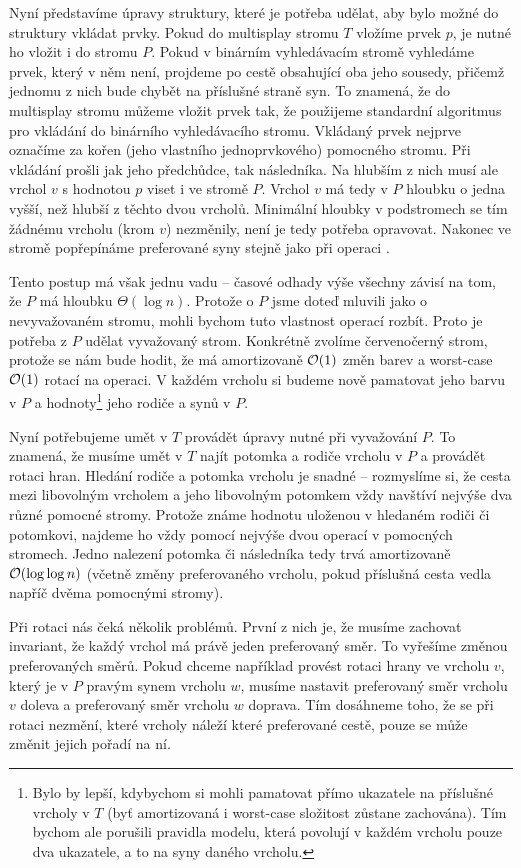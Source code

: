 Nyní představíme úpravy struktury, které je potřeba udělat, aby bylo možné do
struktury vkládat prvky.  Pokud do multisplay stromu $T$ vložíme prvek $p$, je
nutné ho vložit i do stromu $P$. Pokud v binárním vyhledávacím stromě vyhledáme
prvek, který v něm není, projdeme po cestě obsahující oba jeho sousedy, přičemž
jednomu z nich bude chybět na příslušné straně syn. To znamená, že do
multisplay stromu můžeme vložit prvek tak, že použijeme standardní algoritmus
pro vkládání do binárního vyhledávacího stromu. Vkládaný prvek nejprve označíme
za kořen (jeho vlastního jednoprvkového) pomocného stromu. Při vkládání prošli
jak jeho předchůdce, tak následníka. Na hlubším z nich musí ale vrchol $v$ s
hodnotou $p$ viset i ve stromě $P$. Vrchol $v$ má tedy v $P$ hloubku o jedna vyšší,
než hlubší z těchto dvou vrcholů. Minimální hloubky v podstromech se tím
žádnému vrcholu (krom $v$) nezměnily, není je tedy potřeba opravovat. Nakonec
ve stromě popřepínáme preferované syny stejně jako při operaci .

Tento postup má však jednu vadu -- časové odhady výše všechny závisí na tom, že
$P$ má hloubku $\Theta(\log n)$. Protože o $P$ jsme doteď mluvili jako o
nevyvažovaném stromu, mohli bychom tuto vlastnost operací  rozbít.
Proto je potřeba z $P$ udělat vyvažovaný strom. Konkrétně zvolíme červenočerný
strom, protože se nám bude hodit, že má amortizovaně $\mathcal O(1)$ změn barev a
worst-case $\mathcal O(1)$ rotací na operaci. V každém vrcholu si budeme nově pamatovat
jeho barvu v $P$ a hodnoty\footnote{Bylo by lepší, kdybychom si mohli pamatovat
přímo ukazatele na příslušné vrcholy v $T$ (byť amortizovaná i worst-case složitost zůstane zachována). Tím bychom ale
porušili pravidla modelu, která povolují v každém vrcholu pouze dva ukazatele,
a to na syny daného vrcholu.} jeho rodiče a synů v $P$. 

Nyní potřebujeme umět v $T$ provádět úpravy nutné při vyvažování $P$. To
znamená, že musíme umět v $T$ najít potomka a rodiče vrcholu v $P$ a provádět
rotaci hran. Hledání rodiče a potomka vrcholu je snadné -- rozmyslíme si, že
cesta mezi libovolným vrcholem a jeho libovolným potomkem vždy navštíví nejvýše
dva různé pomocné stromy. Protože známe hodnotu uloženou v hledaném rodiči či
potomkovi, najdeme ho vždy pomocí nejvýše dvou operací  v pomocných
stromech. Jedno nalezení potomka či následníka tedy trvá amortizovaně
$\mathcal O(\log\log n)$ (včetně změny preferovaného vrcholu, pokud příslušná cesta
vedla napříč dvěma pomocnými stromy).

Při rotaci nás čeká několik problémů. První z nich je, že musíme zachovat
invariant, že každý vrchol má právě jeden preferovaný směr. To vyřešíme změnou
preferovaných směrů. Pokud chceme například provést rotaci hrany ve vrcholu
$v$, který je v $P$ pravým synem vrcholu $w$, musíme nastavit preferovaný směr
vrcholu $v$ doleva a preferovaný směr vrcholu $w$ doprava. Tím dosáhneme toho,
že se při rotaci nezmění, které vrcholy náleží které preferované cestě, pouze
se může změnit jejich pořadí na ní.

